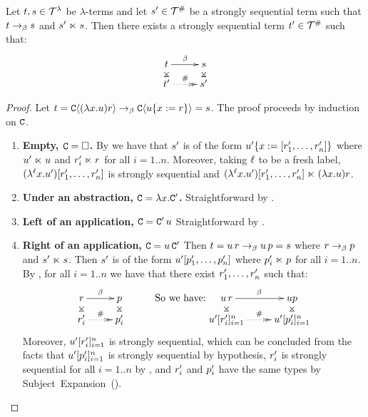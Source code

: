 \begin{lemma}
Let $t,s \in \mathcal{T}^{\lambda}$ be $\lambda$-terms and
let $s' \in \mathcal{T}^{\mathtt{\#}}$ be a strongly sequential term such that
$t \mathrel{\to_\beta} s$ and $s' \mathrel{\ltimes} s$.
Then there exists a strongly sequential term $t' \in \mathcal{T}^{\mathtt{\#}}$ such that:
\[
\xymatrix@R=.25cm{
 \tm \ar@{}[d]|*=0[@]{\rtimes} \ar[r]^{\beta} & \tmtwo \ar@{}[d]|*=0[@]{\rtimes} \\
 \tm' \ar@{.>>}[r]^{\dist} & \tmtwo' \\
}
\]
\end{lemma}
\begin{proof}
Let $t = \mathtt{C}\langle(\lambda x. u)r\rangle \mathrel{\to_\beta} \mathtt{C}\langle u\{x := r\}\rangle = s$.
The proof proceeds by induction on $\mathtt{C}$.
\begin{enumerate}
\item {\bf Empty, $\mathtt{C} = \Box$.}
  By  we have that $s'$
  is of the form $u'\{x := [r'_1,\hdots,r'_n]\}$
  where $u' \mathrel{\ltimes} u$ and $r'_i \mathrel{\ltimes} r$ for all $i=1..n$.
  Moreover, taking $\ell$ to be a fresh label, $(\lambda^{\ell} x. u')[r'_1,\hdots,r'_n]$ 
  is strongly sequential and
  $(\lambda^{\ell} x. u')[r'_1,\hdots,r'_n] \mathrel{\ltimes} (\lambda x. u)r$.
\item {\bf Under an abstraction, $\mathtt{C} = \lambda x. \mathtt{C}'$.}
  Straightforward by \ih.
\item {\bf Left of an application, $\mathtt{C} = \mathtt{C}'\,u$}
  Straightforward by \ih.
\item {\bf Right of an application, $\mathtt{C} = u\,\mathtt{C}'$}
  Then $t = u\,r \mathrel{\to_\beta} u\,p = s$
  where $r \mathrel{\to_\beta} p$ and $s' \mathrel{\ltimes} s$.
  Then $s'$ is of the form $u'[p'_1,\hdots,p'_n]$ where $p'_i \mathrel{\ltimes} p$ for all $i=1..n$.
  By \ih, for all $i=1..n$ we have that there exist $r'_1,\hdots,r'_n$ such that:
  \[
  \xymatrix@R=.25cm{
   \tmfour \ar@{}[d]|*=0[@]{\rtimes} \ar[r]^{\beta} & \tmfive \ar@{}[d]|*=0[@]{\rtimes} \\
   \tmfour'_i \ar@{.>>}[r]^{\dist} & \tmfive'_i \\
  }
  \HS\HS\text{So we have:}
  \xymatrix@R=.25cm{
   \tmthree\,\tmfour \ar@{}[d]|*=0[@]{\rtimes} \ar[r]^{\beta} & \tmthree\tmfive \ar@{}[d]|*=0[@]{\rtimes} \\
   \tmthree'[\tmfour'_i]_{i=1}^{n} \ar@{.>>}[r]^{\dist} & \tmthree'[\tmfive'_i]_{i=1}^{n}  \\
  }
  \]
  Moreover, $u'[r'_i]_{i=1}^{n}$ is strongly sequential, which can be concluded
  from the facts that $u'[p'_i]_{i=1}^{n}$ is strongly sequential by hypothesis,
  $r'_i$ is strongly sequential for all $i=1..n$ by \ih,
  and $r'_i$ and $p'_i$ have the same types by Subject~Expansion~().
\end{enumerate}
\end{proof}

